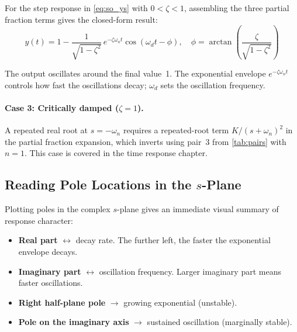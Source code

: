 \documentclass[12pt]{article}
\newcommand{\figplaceholder}[2][3in]{%
  \begin{center}
  \fbox{\parbox{#1}{\centering\vspace{0.5in}\textit{[Figure: #2]}\vspace{0.5in}}}
  \end{center}
}
\begin{document}
For the step response in \cref{eq:so_ys} with $0 < \zeta < 1$, assembling the
three partial fraction terms gives the closed-form result:
\begin{equation}
  \boxed{y(t) = 1 - \frac{1}{\sqrt{1-\zeta^2}}\,e^{-\zeta\omega_n t}
    \cos\!\left(\omega_d t - \phi\right),
  \quad \phi = \arctan\!\left(\frac{\zeta}{\sqrt{1-\zeta^2}}\right)}
  \label{eq:so_response}
\end{equation}

The output oscillates around the final value~1.  The exponential envelope
$e^{-\zeta\omega_n t}$ controls how fast the oscillations decay; $\omega_d$
sets the oscillation frequency.

\figplaceholder[3.5in]{Underdamped second-order step response for $\zeta = 0.5$,
  $\omega_n = 1\,\text{rad/s}$.  Annotate the $e^{-\zeta\omega_n t}$ envelope,
  the period $2\pi/\omega_d$, and the final value~1.}

\paragraph{Case 3: Critically damped ($\zeta = 1$).}  A repeated real root
at $s = -\omega_n$ requires a repeated-root term $K/(s+\omega_n)^2$ in the
partial fraction expansion, which inverts using pair~3 from \cref{tab:pairs}
with $n = 1$.  This case is covered in the time response chapter.

\subsection{Reading Pole Locations in the $s$-Plane}
\label{sec:splane}

Plotting poles in the complex $s$-plane gives an immediate visual summary of
response character:

\begin{itemize}
  \item \textbf{Real part} $\leftrightarrow$ decay rate.  The further left, the
    faster the exponential envelope decays.
  \item \textbf{Imaginary part} $\leftrightarrow$ oscillation frequency.
    Larger imaginary part means faster oscillations.
  \item \textbf{Right half-plane pole} $\rightarrow$ growing exponential
    (unstable).
  \item \textbf{Pole on the imaginary axis} $\rightarrow$ sustained oscillation
    (marginally stable).
\end{itemize}
\end{document}
